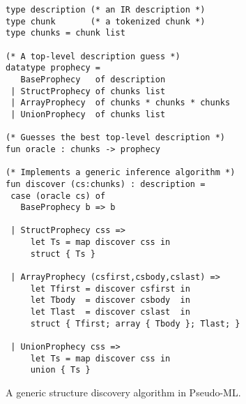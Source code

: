 \begin{figure}
{\small
\begin{verbatim}
type description (* an IR description *)
type chunk       (* a tokenized chunk *)
type chunks = chunk list

(* A top-level description guess *)
datatype prophecy =
   BaseProphecy   of description
 | StructProphecy of chunks list 
 | ArrayProphecy  of chunks * chunks * chunks
 | UnionProphecy  of chunks list

(* Guesses the best top-level description *)
fun oracle : chunks -> prophecy

(* Implements a generic inference algorithm *)
fun discover (cs:chunks) : description =
 case (oracle cs) of
   BaseProphecy b => b

 | StructProphecy css => 
     let Ts = map discover css in
     struct { Ts }

 | ArrayProphecy (csfirst,csbody,cslast) => 
     let Tfirst = discover csfirst in
     let Tbody  = discover csbody  in
     let Tlast  = discover cslast  in
     struct { Tfirst; array { Tbody }; Tlast; }

 | UnionProphecy css => 
     let Ts = map discover css in
     union { Ts }
\end{verbatim}
}
\caption{A generic structure discovery algorithm in Pseudo-ML.}
\label{fig:structure-discovery}
\end{figure}
